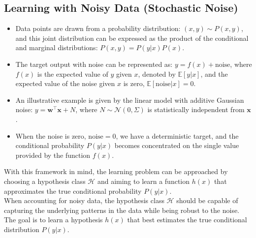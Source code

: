 \subsection{Learning with Noisy Data (Stochastic Noise)}

\begin{itemize}
    \item Data points are drawn from a probability distribution: \( (x, y) \sim P(x, y) \), and this joint distribution can be expressed as the product of the conditional and marginal distributions: \( P(x, y) = P(y|x)P(x) \).
    \item The target output with noise can be represented as: \( y = f(x) + \text{noise} \), where \( f(x) \) is the expected value of \( y \) given \( x \), denoted by \( \mathbb{E}[y|x] \), and the expected value of the noise given \( x \) is zero, \( \mathbb{E}[\text{noise}|x] = 0 \).
    \item An illustrative example is given by the linear model with additive Gaussian noise: \( y = \mathbf{w}^\top \mathbf{x} + N \), where \( N \sim \mathcal{N}(0, \Sigma) \) is statistically independent from \( \mathbf{x} \).
    \item When the noise is zero, \( \text{noise} = 0 \), we have a deterministic target, and the conditional probability \( P(y|x) \) becomes concentrated on the single value provided by the function \( f(x) \).
\end{itemize}

With this framework in mind, the learning problem can be approached by choosing a hypothesis class \( \mathcal{H} \) and aiming to learn a function \( h(x) \) that approximates the true conditional probability \( P(y|x) \).\\

When accounting for noisy data, the hypothesis class \( \mathcal{H} \) should be capable of capturing the underlying patterns in the data while being robust to the noise.\\

The goal is to learn a hypothesis \( h(x) \) that best estimates the true conditional distribution \( P(y|x) \).

